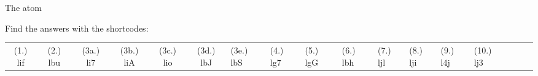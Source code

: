 \begin{eocexercises}{The atom}
\begin{enumerate}[noitemsep, label=\textbf{\arabic*}. ]
\begin{table}[H]
\end{table}
    \par
\end{enumerate}
  \label{m38741**end}
  \label{ea1c9e59656f96ee804546971cf6dee6**end}
\practiceinfo
\par {} Find the answers with the shortcodes:
 \par \begin{tabular}[h]{cccccc}
 (1.) lif  &  (2.) lbu  &  (3a.) li7  &  (3b.) liA  &  (3c.) lio  &  (3d.) lbJ  &  (3e.) lbS  &  (4.) lg7  &  (5.) lgG  &  (6.) lbh  &  (7.) ljl  &  (8.) lji  &  (9.) l4j  &  (10.) lj3  &  & &  & \end{tabular}

\end{eocexercises}
